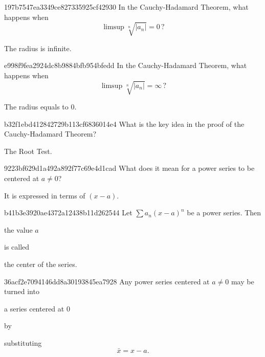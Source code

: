 \begin{note}{197b7547ea3349ce827335925cf42930}
    In the Cauchy-Hadamard Theorem, what happens when
    \[
        \limsup \sqrt[n]{\left\lvert a_n \right\rvert} = 0\,?
    \]

    \begin{cloze}{1}
        The radius is infinite.
    \end{cloze}
\end{note}

\begin{note}{e998f9fea2924dc8b9884bfb954bfedd}
    In the Cauchy-Hadamard Theorem, what happens when
    \[
        \limsup \sqrt[n]{\left\lvert a_n \right\rvert} = \infty\,?
    \]

    \begin{cloze}{1}
        The radius equals to \({ 0 }\).
    \end{cloze}
\end{note}

\begin{note}{b32f1ebd412842729b113cf6836014e4}
    What is the key idea in the proof of the Cauchy-Hadamard Theorem?

    \begin{cloze}{1}
        The Root Test.
    \end{cloze}
\end{note}

\begin{note}{9223bf629d1a492a892f77c69e4d1cad}
    What does it mean for a power series to be centered at \({ a \neq 0 }\)?

    \begin{cloze}{1}
        It is expressed in terms of \({ (x - a) }\).
    \end{cloze}
\end{note}

\begin{note}{b41b3e3920ae4372a12438b11d262544}
    Let \({ \sum a_n (x - a)^{n} }\) be a power series.
    Then \begin{icloze}{2}the value \({ a }\)\end{icloze} is called \begin{icloze}{1}the center of the series.\end{icloze}
\end{note}

\begin{note}{36acf2e7094146dd8a30193845ea7928}
    Any power series centered at \({ a \neq 0 }\) may be turned into \begin{icloze}{2}a series centered at \({ 0 }\)\end{icloze} by
    \begin{icloze}{1}
        substituting
        \[
            \bar x = x - a.
        \]
    \end{icloze}
\end{note}

